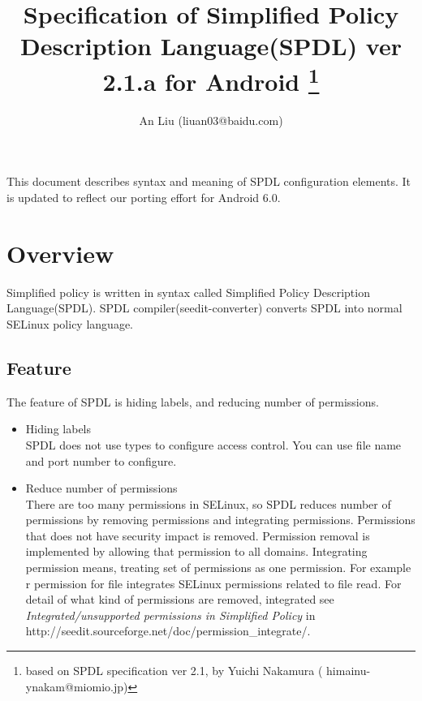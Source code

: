 \documentclass{article}
\title{Specification of Simplified Policy Description Language(SPDL) ver 2.1.a 
for Android \thanks{based on SPDL specification ver 2.1, by Yuichi Nakamura ( 
himainu-ynakam@miomio.jp)}}
\author{An Liu (liuan03@baidu.com)}
\begin{document}
\maketitle
\tableofcontents
\newpage
This document describes syntax and meaning of SPDL configuration elements. It 
is updated to reflect our porting effort for Android 6.0.

\section{Overview}
Simplified policy is written in  syntax  called Simplified Policy
Description Language(SPDL). SPDL compiler(seedit-converter) converts
SPDL into normal SELinux policy language.

\subsection{Feature}
The feature of SPDL is hiding labels, and reducing number of
permissions.
\begin{itemize}
 \item Hiding labels\\
       SPDL does not use types to configure access control. You can use
       file name and port number to configure.
 \item Reduce number of permissions\\
       There are too many permissions in SELinux, so SPDL reduces number
       of permissions by removing permissions and integrating
       permissions.
       Permissions that does not have security impact is
       removed. Permission removal is implemented by allowing that
       permission to all domains. Integrating permission means, treating
       set of permissions as one permission. For example r permission
       for file integrates SELinux permissions related to file read.
       For detail of what kind of permissions are removed, integrated  see {\it
       Integrated/unsupported permissions in Simplified Policy } in
       http://seedit.sourceforge.net/doc/permission\_integrate/.
\end{itemize}
\end{document}
